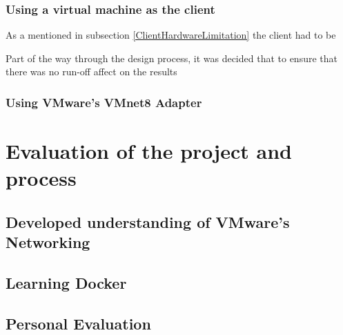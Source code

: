\subsection{Using a virtual machine as the client}%
\label{compr:client}
As a mentioned in subsection \ref{ClientHardwareLimitation} the client had to be 

Part of the way through the design process, it was decided that to ensure that there was no run-off affect on the results


\subsection{Using VMware's VMnet8 Adapter}%






\chapter{Evaluation of the project and process}%

\section{Developed understanding of VMware's Networking}

\section{Learning Docker}

\section{Personal Evaluation}%